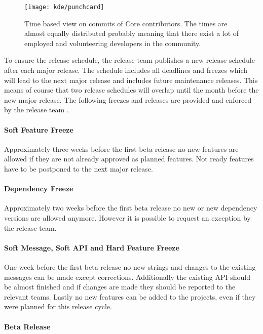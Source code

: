\begin{figure}[htbp]
  \centering
  \texttt{[image: kde/punchcard]}
  \caption{Time based view on commits of Core contributors. The times are
  almost equally distributed probably meaning that there exist a lot of
  employed and volunteering developers in the community.}
\end{figure}

To ensure the release schedule, the release team publishes a new release
schedule after each major release. The schedule includes all deadlines and
freezes which will lead to the next major release and includes future
maintenance releases. This means of course that two release schedules will
overlap until the month before the new major release. The following freezes and
releases are provided and enforced by the release team
\cite{KDEReleaseSchedule}.

\paragraph{Soft Feature Freeze}

Approximately three weeks before the first beta release no new features are
allowed if they are not already approved as planned features. Not ready
features have to be postponed to the next major release.

\paragraph{Dependency Freeze}

Approximately two weeks before the first beta release no new or new dependency
versions are allowed anymore. However it is possible to request an exception by
the release team.

\paragraph{Soft Message, Soft API and Hard Feature Freeze}

One week before the first beta release no new strings and changes to the
existing messages can be made except corrections. Additionally the existing API
should be almost finished and if changes are made they should be reported to
the relevant teams. Lastly no new features can be added to the projects, even
if they were planned for this release cycle.

\paragraph{Beta Release}

